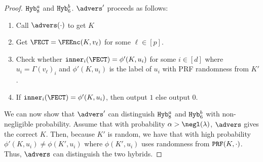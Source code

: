 \begin{lemma}
\begin{proof}
	$\texttt{Hyb}_8^a$ and $\texttt{Hyb}_6^b$.
	$\advers'$ proceeds as follows:
	\begin{enumerate}
		\item Call $\advers(\cdot)$ to get $K$
		\item Get $\FECT = \FEEnc(K, v_\ell)$ for some $\ell \in [p]$.
		\item Check whether $\inner_i(\FECT) = \phi'(K, u_i)$ for some $i \in [d]$ where $u_i = \Gamma(v_\ell)_i$
		and $\phi'(K, u_i)$ is the label of $u_i$ with PRF randomness from $K'$.
		\item If $\inner_i(\FECT) = \phi'(K, u_i)$, then output $1$ else output $0$.
	\end{enumerate}
	We can now show that $\advers'$ can distinguish $\texttt{Hyb}_8^a$ and $\texttt{Hyb}_6^b$ with non-negligible probability.
	Assume that with probability $\alpha > \negl(\lambda)$, $\advers$ gives the correct $K$.
	Then, because $K'$ is random, we have that with high probability $\phi'(K, u_i) \neq \phi(K', u_i)$ where $\phi(K', u_i)$ uses randomness from $\texttt{PRF}(K, \cdot)$.
	Thus, $\advers$ can distinguish the two hybrids.
	\end{proof}
\end{lemma}

